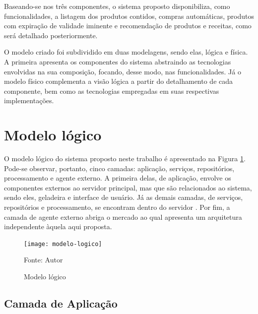 Baseando-se nos três componentes, o sistema proposto disponibiliza, como funcionalidades, a listagem dos produtos contidos, compras automáticas, produtos com expiração de validade iminente e recomendação de produtos e receitas, como será detalhado posteriormente.
    
    
O modelo criado foi subdividido em duas modelagens, sendo elas, lógica e física. A primeira apresenta os componentes do sistema abstraindo as tecnologias envolvidas na sua composição, focando, desse modo, nas funcionalidades. Já o modelo físico complementa a visão lógica a partir do detalhamento de cada componente, bem como as tecnologias empregadas em suas respectivas implementações.

\section{Modelo lógico}

O modelo lógico do sistema proposto neste trabalho é apresentado na Figura \ref{fig:c4_modelo_logico}. Pode-se observar, portanto, cinco camadas: aplicação, serviços, repositórios, processamento e agente externo. A primeira delas, de aplicação, envolve os componentes externos ao servidor principal, mas que são relacionados ao sistema, sendo eles, geladeira e interface de usuário. Já as demais camadas, de serviços, repositórios e processamento, se encontram dentro do servidor%
. Por fim, a camada de agente externo abriga o mercado ao qual apresenta um arquitetura independente àquela aqui proposta.


\begin{figure}[htb]
    \caption{Modelo lógico}
    \label{fig:c4_modelo_logico}
    \texttt{[image: modelo-logico]}
    
    \footnotesize{Fonte: Autor}
\end{figure}
\nocite{Freepik2017} %

\subsection{Camada de Aplicação}


